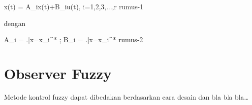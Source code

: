 \rumus
    {x(t) = A_ix(t)+B_iu(t), i=1,2,3,...,r}
    {rumus-1}

\noindent dengan

\rumus
    {A_i = \left.\right|x=x_i^* ; B_i = \left.\right|x=x_i^*}
    {rumus-2}

\section{Observer Fuzzy}

Metode kontrol fuzzy dapat dibedakan berdasarkan cara desain dan bla bla bla…